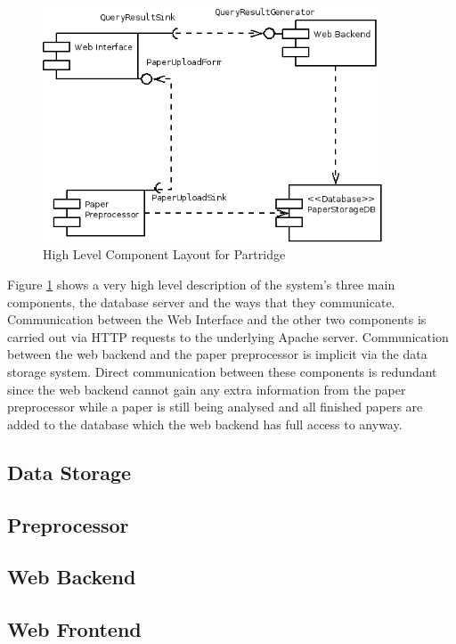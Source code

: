\begin{figure}[!ht]
\center
\includegraphics[width=0.9\textwidth]{images/design/components_high_level.png}
\caption{High Level Component Layout for Partridge}
\label{fig:high_level_components}
\end{figure}

Figure \ref{fig:high_level_components} shows a very high level description of
the system's three main components, the database server and the ways that they
communicate. Communication between the Web Interface and the other two
components is carried out via HTTP requests to the underlying Apache server.
Communication between the web backend and the paper preprocessor is implicit
via the data storage system. Direct communication between these components is
redundant since the web backend cannot gain any extra information from the
paper preprocessor while a paper is still being analysed and all finished
papers are added to the database which the web backend has full access to
anyway.

\subsection{ Data Storage }

\subsection{ Preprocessor }

\subsection{ Web Backend }

\subsection{ Web Frontend }
